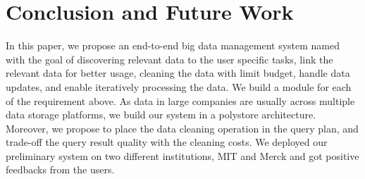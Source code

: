 \section{Conclusion and Future Work}
\label{sec:conclusion}

In this paper, we propose an end-to-end big data management system named \dcv with the goal of discovering relevant data to the user specific tasks, link the relevant data for better usage, cleaning the data with limit budget, handle data updates, and enable iteratively processing the data. We build a module for each of the requirement above. As data in large companies are usually across multiple data storage platforms, we build our system in a polystore architecture. Moreover, we propose to place the data cleaning operation in the query plan, and trade-off the query result quality with the cleaning costs. We deployed our preliminary system on two different institutions, MIT and Merck and got positive feedbacks from the users.


